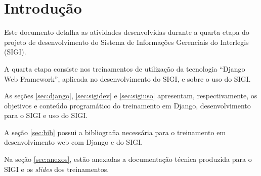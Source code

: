 %
%

\section{Introdução}
Este documento detalha as atividades desenvolvidas durante a quarta
etapa do projeto de desenvolvimento do Sistema de Informações
Gerenciais do Interlegis (SIGI).

A quarta etapa consiste nos treinamentos de utilização da tecnologia
``Django Web Framework'', aplicada no desenvolvimento do SIGI, e sobre
o uso do SIGI.

As seções \ref{sec:django}, \ref{sec:sigidev} e \ref{sec:sigiuso}
apresentam, respectivamente, os objetivos e conteúdo programático do
treinamento em Django, desenvolvimento para o SIGI e uso do SIGI.

A seção \ref{sec:bib} possui a bibliografia necessária para o
treinamento em desenvolvimento web com Django e do SIGI.

Na seção \ref{sec:anexos}, estão anexadas a documentação técnica
produzida para o SIGI e os \textit{slides} dos treinamentos.

%
%
